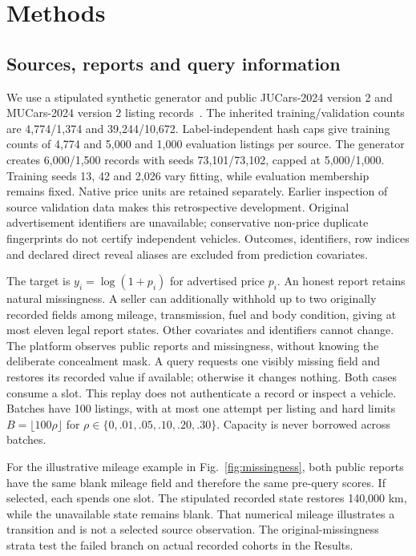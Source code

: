 \documentclass[pdflatex,sn-nature]{sn-jnl}
\begin{document}
\section{Methods}
\subsection{Sources, reports and query information}
\label{sec:source_query}
We use a stipulated synthetic generator and public JUCars-2024 version 2
and MUCars-2024 version 2 listing records~\cite{thalji2026jucars,tabarnoust2024mucars}.
The inherited training/validation counts are 4,774/1,374 and 39,244/10,672.
Label-independent hash caps give training counts of 4,774 and 5,000 and
1,000 evaluation listings per source. The generator creates 6,000/1,500
records with seeds 73,101/73,102, capped at 5,000/1,000. Training seeds
13, 42 and 2,026 vary fitting, while evaluation membership remains fixed.
Native price units are retained separately. Earlier inspection of source
validation data makes this retrospective development. Original advertisement
identifiers are unavailable; conservative non-price duplicate fingerprints
do not certify independent vehicles. Outcomes, identifiers, row indices and
declared direct reveal aliases are excluded from prediction covariates.

The target is $y_i=\log(1+p_i)$ for advertised price $p_i$. An honest report
retains natural missingness. A seller can additionally withhold up to two
originally recorded fields among mileage, transmission, fuel and body condition,
giving at most eleven legal report states. Other covariates and identifiers
cannot change. The platform observes public reports and missingness, without
knowing the deliberate concealment mask. A query requests one visibly missing
field and restores its recorded value if available; otherwise it changes
nothing. Both cases consume a slot. This replay does not authenticate a
record or inspect a vehicle. Batches have 100 listings, with at most one
attempt per listing and hard limits $B=\lfloor100\rho\rfloor$ for
$\rho\in\{0,.01,.05,.10,.20,.30\}$. Capacity is never borrowed across batches.

For the illustrative mileage example in Fig.~\ref{fig:missingness}, both
public reports have the same blank mileage field and therefore the same
pre-query scores. If selected, each spends one slot. The stipulated recorded
state restores 140,000 km, while the unavailable state remains blank.
That numerical mileage illustrates a transition and is not a selected source
observation. The original-missingness strata test the failed branch on actual
recorded cohorts in the Results.
\end{document}
